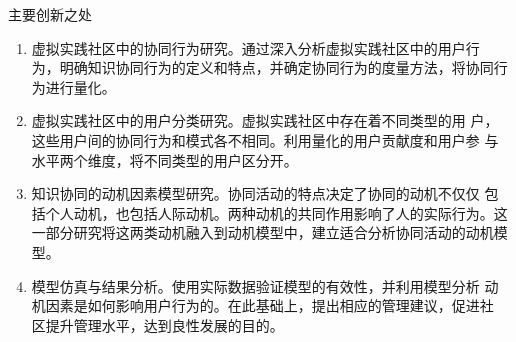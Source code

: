 \documentclass[slidestop,compress,mathserif,table]{beamer}
\begin{document}
   \begin{frame}{主要创新之处}
\small
     \begin{enumerate}
\item 虚拟实践社区中的协同行为研究。通过深入分析虚拟实践社区中的用户行
  为，明确知识协同行为的定义和特点，并确定协同行为的度量方法，将协同行
  为进行量化。
\item 虚拟实践社区中的用户分类研究。虚拟实践社区中存在着不同类型的用
  户，这些用户间的协同行为和模式各不相同。利用量化的用户贡献度和用户参
  与水平两个维度，将不同类型的用户区分开。
\item 知识协同的动机因素模型研究。协同活动的特点决定了协同的动机不仅仅
包括个人动机，也包括人际动机。两种动机的共同作用影响了人的实际行为。这
一部分研究将这两类动机融入到动机模型中，建立适合分析协同活动的动机模型。

\item 模型仿真与结果分析。使用实际数据验证模型的有效性，并利用模型分析
  动机因素是如何影响用户行为的。在此基础上，提出相应的管理建议，促进社
  区提升管理水平，达到良性发展的目的。

\end{enumerate}
   \end{frame}
\end{document}
